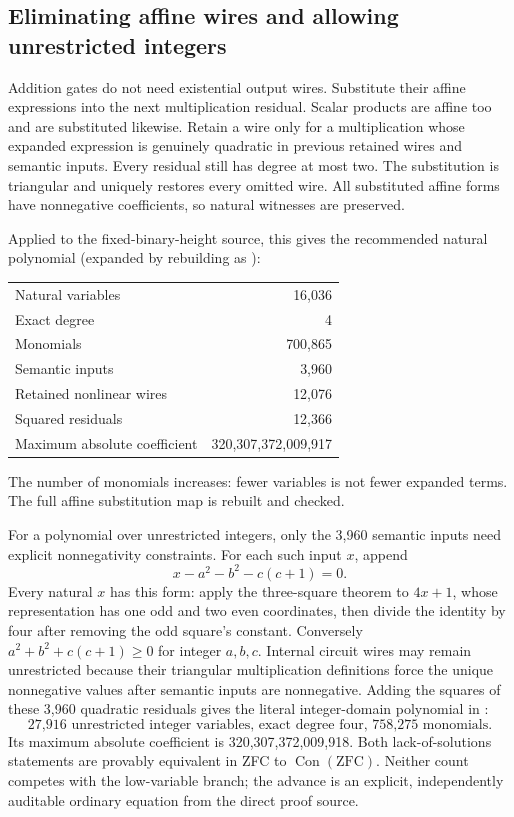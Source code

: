 \documentclass[11pt]{article}
\begin{document}
\subsection{Eliminating affine wires and allowing unrestricted integers}

Addition gates do not need existential output wires. Substitute their
affine expressions into the next multiplication residual. Scalar products
are affine too and are substituted likewise. Retain a wire only for a
multiplication whose expanded expression is genuinely quadratic in
previous retained wires and semantic inputs. Every residual still has
degree at most two. The substitution is triangular and uniquely
restores every omitted wire. All substituted affine forms have
nonnegative coefficients, so natural witnesses are preserved.

Applied to the fixed-binary-height source, this gives the recommended
natural polynomial (expanded by rebuilding as
):
\begin{center}
\begin{tabular}{lr}
Natural variables & 16,036\\
Exact degree & 4\\
Monomials & 700,865\\
Semantic inputs & 3,960\\
Retained nonlinear wires & 12,076\\
Squared residuals & 12,366\\
Maximum absolute coefficient & 320,307,372,009,917
\end{tabular}
\end{center}
The number of monomials increases: fewer variables is not fewer expanded
terms. The full affine substitution map is rebuilt and checked.

For a polynomial over unrestricted integers, only the 3,960 semantic
inputs need explicit nonnegativity constraints. For each such input $x$,
append
\[
 x-a^2-b^2-c(c+1)=0.
\]
Every natural $x$ has this form: apply the three-square theorem to
$4x+1$, whose representation has one odd and two even coordinates, then
divide the identity by four after removing the odd square's constant.
Conversely $a^2+b^2+c(c+1)\geq0$ for integer $a,b,c$.
Internal circuit wires may remain unrestricted because their triangular
multiplication definitions force the unique nonnegative values after
semantic inputs are nonnegative. Adding the squares of these 3,960
quadratic residuals gives the literal integer-domain polynomial in
:
\[
 \boxed{\text{27,916 unrestricted integer variables, exact degree four,
 758,275 monomials.}}
\]
Its maximum absolute coefficient is 320,307,372,009,918.
Both lack-of-solutions statements are provably equivalent in ZFC to
$\operatorname{Con}(\mathrm{ZFC})$. Neither count competes with the
low-variable branch; the advance is an explicit, independently auditable
ordinary equation from the direct proof source.
\end{document}

